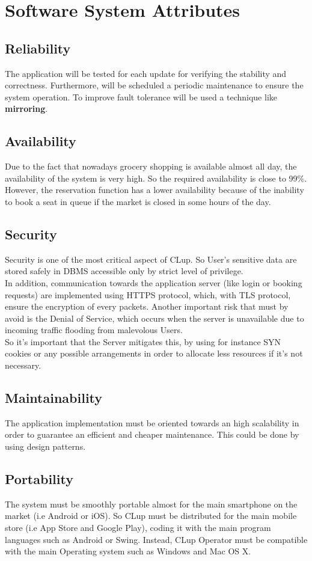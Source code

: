\pagebreak

\section{Software System Attributes}
\subsection{Reliability}
The application will be tested for each update for verifying the stability and correctness.
Furthermore, will be scheduled a periodic maintenance to ensure the system operation.
To improve fault tolerance will be used a technique like \textbf{mirroring}.
 

\subsection{Availability}
Due to the fact that nowadays grocery shopping is available almost all day, the availability of the system is very high. So the required availability is close to 99\%. \\
However, the reservation function has a lower availability because of the inability to book a seat in queue if the market is closed in some hours of the day. 
\subsection{Security}
Security is one of the most critical aspect of CLup. So User's sensitive data are stored safely in DBMS accessible only by strict level of privilege.\\ 
In addition, communication towards the application server (like login or booking requests) are implemented using  HTTPS protocol, which, with TLS protocol, ensure the encryption of every packets. Another important risk that must by avoid is the Denial of Service, which occurs when the server is unavailable due to incoming traffic flooding from malevolous Users.\\
So it's important that the Server mitigates this, by using for instance SYN cookies or any possible arrangements in order to allocate less resources if it's not necessary.
\subsection{Maintainability}
The application implementation must be oriented towards an high scalability in order to guarantee an efficient and cheaper maintenance. This could be done by using design patterns.
\subsection{Portability}
The system must be smoothly portable almost for the main smartphone on the market (i.e Android or iOS). So CLup must be distributed for the main mobile store (i.e App Store and Google Play), coding it with the main program languages such as Android or Swing. Instead, CLup Operator
must be compatible with the main Operating system such as Windows and Mac OS X.

